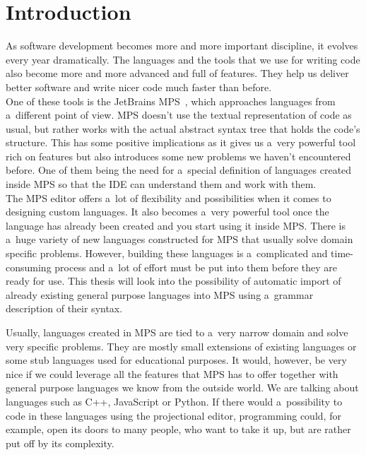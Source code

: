 \chapter{Introduction}

As software development becomes more and more important discipline, it evolves every year dramatically.
The languages and the tools that we use for writing code also become more and more advanced and full of features.
They help us deliver better software and write nicer code much faster than before.
\\

One of these tools is the JetBrains MPS~\cite{MPS}, which approaches languages from a~different point of view.
MPS doesn't use the textual representation of code as usual, but rather works with the actual abstract syntax tree that holds the code's structure.
This has some positive implications as it gives us a~very powerful tool rich on features but also introduces some new problems we haven't encountered before.
One of them being the need for a~special definition of languages created inside MPS so that the IDE can understand them and work with them.
\\

The MPS editor offers a~lot of flexibility and possibilities when it comes to designing custom languages.
It also becomes a~very powerful tool once the language has already been created and you start using it inside MPS.
There is a~huge variety of new languages constructed for MPS that usually solve domain specific problems.
However, building these languages is a~complicated and time-consuming process and a~lot of effort must be put into them before they are ready for use.
This thesis will look into the possibility of automatic import of already existing general purpose languages into MPS using a~grammar description of their syntax.

Usually, languages created in MPS are tied to a~very narrow domain and solve very specific problems.
They are mostly small extensions of existing languages or some stub languages used for educational purposes.
It would, however, be very nice if we could leverage all the features that MPS has to offer together with general purpose languages we know from the outside world.
We are talking about languages such as C++, JavaScript or Python.
If there would a~possibility to code in these languages using the projectional editor, programming could, for example, open its doors to many people, who want to take it up, but are rather put off by its complexity.
\\

